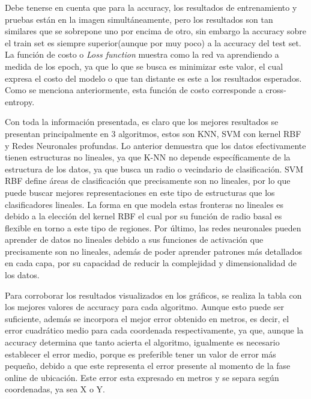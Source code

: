 Debe tenerse en cuenta que para la accuracy, los resultados de entrenamiento y pruebas están en la imagen simultáneamente, pero los resultados son tan similares que se sobrepone uno por encima de otro, sin embargo la accuracy sobre el train set es siempre superior(aunque por muy poco) a la accuracy del test set. La función de costo o \textit{Loss function} muestra como la red va aprendiendo a medida de los epoch, ya que lo que se busca es minimizar este valor, el cual expresa el costo del modelo o que tan distante es este a los resultados esperados. Como se menciona anteriormente, esta función de costo corresponde a cross-entropy.

Con toda la información presentada, es claro que los mejores resultados se presentan principalmente en 3 algoritmos, estos son KNN, SVM con kernel RBF y Redes Neuronales profundas. Lo anterior demuestra que los datos efectivamente tienen estructuras no lineales, ya que K-NN no depende específicamente de la estructura de los datos, ya que busca un radio o vecindario de clasificación. SVM RBF define áreas de clasificación que precisamente son no lineales, por lo que puede buscar mejores representaciones en este tipo de estructuras que los clasificadores lineales. La forma en que modela estas fronteras no lineales es debido a la elección del kernel RBF el cual por su función de radio basal es flexible en torno a este tipo de regiones. Por último, las redes neuronales pueden aprender de datos no lineales debido a sus funciones de activación que precisamente son no lineales, además de poder aprender patrones más detallados en cada capa, por su capacidad de reducir la complejidad y dimensionalidad de los datos.

Para corroborar los resultados visualizados en los gráficos, se realiza la tabla con los mejores valores de accuracy para cada algoritmo. Aunque esto puede ser suficiente, además se incorpora el mejor error obtenido en metros, es decir, el error cuadrático medio para cada coordenada respectivamente, ya que, aunque la accuracy determina que tanto acierta el algoritmo, igualmente es necesario establecer el error medio, porque es preferible tener un valor de error más pequeño, debido a que este representa el error presente al momento de la fase online de ubicación. Este error esta expresado en metros y se separa según coordenadas, ya sea X o Y.

